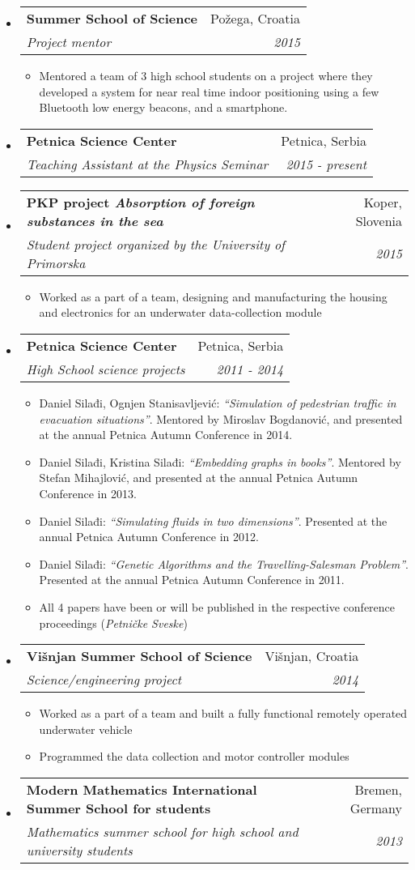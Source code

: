 \documentclass[a4paper]{article}
\makeatletter
\newcommand{\ressubheading}[4]{
\begin{tabular*}{6.5in}{l@{\cftdotfill{\cftsecdotsep}\extracolsep{\fill}}r}
		\textbf{#1} & #2 \\
		\textit{#3} & \textit{#4} \\
\end{tabular*}\vspace{-2pt}}
\makeatother
\begin{document}
\begin{itemize}
\begin{itemize}
	\end{itemize}
	\item \ressubheading{Summer School of Science}{Požega, Croatia}{Project mentor}{2015}
	\begin{itemize}
		\item Mentored a team of 3 high school students on a project where they developed a system for near real time indoor positioning using a few Bluetooth low energy beacons, and a smartphone.
	\end{itemize}
	\item \ressubheading{Petnica Science Center}{Petnica, Serbia}{Teaching Assistant at the Physics Seminar}{2015 - present}
	\item \ressubheading{PKP project \emph{Absorption of foreign substances in the sea}}{Koper, Slovenia}{Student project organized by the University of Primorska}{2015}
	\begin{itemize}
		\item Worked as a part of a team, designing and manufacturing the housing and electronics for an underwater data-collection module
	\end{itemize}
	\item \ressubheading{Petnica Science Center}{Petnica, Serbia}{High School science projects}{2011 - 2014}
	\begin{itemize}
		\item Daniel Silađi, Ognjen Stanisavljević: \emph{``Simulation of pedestrian traffic in evacuation situations''}. Mentored by Miroslav Bogdanović, and presented at the annual Petnica Autumn Conference in 2014.
		\item Daniel Silađi, Kristina Silađi: \emph{``Embedding graphs in books''}. Mentored by Stefan Mihajlović, and presented at the annual Petnica Autumn Conference in 2013.
		\item Daniel Silađi: \emph{``Simulating fluids in two dimensions''}. Presented at the annual Petnica Autumn Conference in 2012.
		\item Daniel Silađi: \emph{``Genetic Algorithms and the Travelling-Salesman Problem''}. Presented at the annual Petnica Autumn Conference in 2011.
		\item All 4 papers have been or will be published in the respective conference proceedings (\emph{Petničke Sveske})
	\end{itemize}
	\item \ressubheading{Višnjan Summer School of Science}{Višnjan, Croatia}{Science/engineering project}{2014}
	\begin{itemize}
		\item Worked as a part of a team and built a fully functional remotely operated underwater vehicle
		\item Programmed the data collection and motor controller modules 
	\end{itemize}
	\item \ressubheading{Modern Mathematics International Summer School for students}{Bremen, Germany}{Mathematics summer school for high school and university students}{2013}
\end{itemize}
\end{document}
